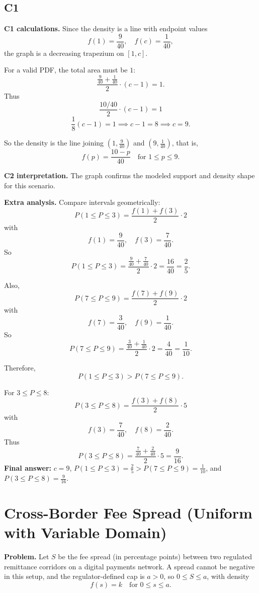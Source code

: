 	\subsection*{C1}
	
	\textbf{C1 calculations.}
	Since the density is a line with endpoint values
	\[
	f(1)=\frac{9}{40},\quad f(c)=\frac{1}{40},
	\]
	the graph is a decreasing trapezium on $[1,c]$.
	
	For a valid PDF, the total area must be $1$:
	\[
	\frac{\frac{9}{40}+\frac{1}{40}}{2}\cdot(c-1)=1.
	\]
	Thus
	\[
	\frac{10/40}{2}\cdot(c-1)=1
	\]
	\[
	\frac18(c-1)=1\implies c-1=8\implies c=9.
	\]
	
	So the density is the line joining $(1,\frac{9}{40})$ and $(9,\frac{1}{40})$, that is,
	\[
	f(p)=\frac{10-p}{40}\quad\text{for }1\le p\le 9.
	\]
	
	\textbf{C2 interpretation.}
	The graph confirms the modeled support and density shape for this scenario.
	
	\textbf{Extra analysis.}
	Compare intervals geometrically:
	\[
	P(1\le P\le3)=\frac{f(1)+f(3)}{2}\cdot2
	\]
	with
	\[
	f(1)=\frac{9}{40},\quad f(3)=\frac{7}{40}.
	\]
	So
	\[
	P(1\le P\le3)=\frac{\frac{9}{40}+\frac{7}{40}}{2}\cdot2=\frac{16}{40}=\frac25.
	\]
	
	Also,
	\[
	P(7\le P\le9)=\frac{f(7)+f(9)}{2}\cdot2
	\]
	with
	\[
	f(7)=\frac{3}{40},\quad f(9)=\frac{1}{40}.
	\]
	So
	\[
	P(7\le P\le9)=\frac{\frac{3}{40}+\frac{1}{40}}{2}\cdot2=\frac{4}{40}=\frac1{10}.
	\]
	
	Therefore,
	\[
	P(1\le P\le3)>P(7\le P\le9).
	\]
	
	For $3\le P\le8$:
	\[
	P(3\le P\le8)=\frac{f(3)+f(8)}{2}\cdot5
	\]
	with
	\[
	f(3)=\frac{7}{40},\quad f(8)=\frac{2}{40}.
	\]
	Thus
	\[
	P(3\le P\le8)=\frac{\frac{7}{40}+\frac{2}{40}}{2}\cdot5=\frac{9}{16}.
	\]
	\textbf{Final answer:} $c=9$, $P(1\le P\le3)=\frac25>P(7\le P\le9)=\frac1{10}$, and $P(3\le P\le8)=\frac9{16}$.
	
	\section{Cross-Border Fee Spread (Uniform with Variable Domain)}
	
	\textbf{Problem.}
	Let $S$ be the fee spread (in percentage points) between two regulated remittance corridors on a digital payments network. A spread cannot be negative in this setup, and the regulator-defined cap is $a>0$, so $0\le S\le a$, with density
	\[
	f(s)=k\quad\text{for }0\le s\le a.
	\]
	
